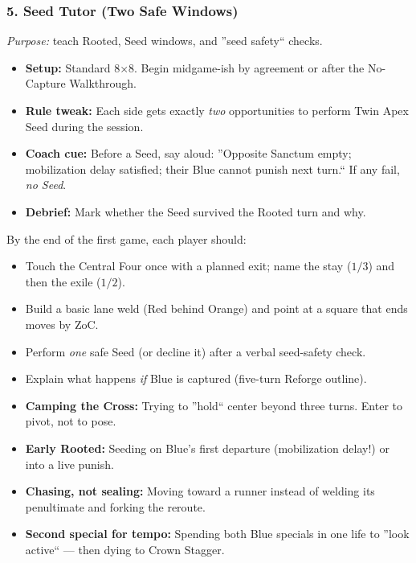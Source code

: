 \documentclass[11pt]{article}
\begin{document}
\subsubsection*{5. Seed Tutor (Two Safe Windows)}
\textit{Purpose:} teach Rooted, Seed windows, and ''seed safety`` checks.
\begin{itemize}[leftmargin=1.3em]
  \item \textbf{Setup:} Standard 8×8. Begin midgame-ish by agreement or after the No-Capture Walkthrough.
  \item \textbf{Rule tweak:} Each side gets exactly \emph{two} opportunities to perform Twin Apex Seed during the session.
  \item \textbf{Coach cue:} Before a Seed, say aloud: ''Opposite Sanctum empty; mobilization delay satisfied; their Blue cannot punish next turn.`` If any fail, \emph{no Seed}.
  \item \textbf{Debrief:} Mark whether the Seed survived the Rooted turn and why.
\end{itemize}

\begin{rulevariant}[title={First-Session Goals (Say These Out Loud)}]
By the end of the first game, each player should:
\begin{itemize}\itemsep0.2em
  \item Touch the Central Four once with a planned exit; name the stay (\(1/3\)) and then the exile (\(1/2\)).
  \item Build a basic lane weld (Red behind Orange) and point at a square that ends moves by ZoC.
  \item Perform \emph{one} safe Seed (or decline it) after a verbal seed-safety check.
  \item Explain what happens \emph{if} Blue is captured (five-turn Reforge outline).
\end{itemize}
\end{rulevariant}

\begin{rulevariant}[title={Common New-Player Pitfalls (Spot \& Stop)}]
\begin{itemize}\itemsep0.2em
  \item \textbf{Camping the Cross:} Trying to ''hold`` center beyond three turns. Enter to pivot, not to pose.
  \item \textbf{Early Rooted:} Seeding on Blue's first departure (mobilization delay!) or into a live punish.
  \item \textbf{Chasing, not sealing:} Moving toward a runner instead of welding its penultimate and forking the reroute.
  \item \textbf{Second special for tempo:} Spending both Blue specials in one life to ''look active`` --- then dying to Crown Stagger.
\end{itemize}
\end{rulevariant}
\end{document}
